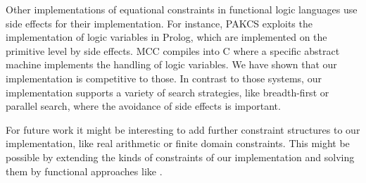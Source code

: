 \documentclass{llncs}
\begin{document}
Other implementations of equational constraints in functional logic
languages use side effects for their implementation.
For instance, PAKCS \cite{Hanus10PAKCS}
exploits the implementation of logic variables in Prolog,
which are implemented on the primitive level by side effects.
MCC \cite{Lux99FLOPS} compiles into C where a specific
abstract machine implements the handling of logic variables.
We have shown that our implementation is competitive to those.
In contrast to those systems, our implementation supports
a variety of search strategies, like breadth-first or parallel search,
where the avoidance of side effects is important.

For future work it might be interesting to add
further constraint structures to our implementation, like real arithmetic
or finite domain constraints.
This might be possible by extending the kinds of constraints
of our implementation and solving them by
functional approaches like \cite{SchrijversStuckeyWadler09}.



\end{document}
